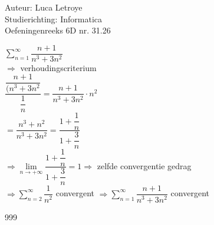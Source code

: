 \documentclass[a4paper]{article}
\begin{document}
  
\noindent \large Auteur: Luca Letroye \\
\noindent \large Studierichting: Informatica\\
\noindent \large Oefeningenreeks 6D nr. 31.26

\medskip
\normalsize

$ \displaystyle\sum_{n=1}^{\infty} \dfrac{n+1}{n^3+3n^2} $\\

$\Rightarrow $ verhoudingscriterium\\

$\dfrac{\dfrac{n+1}{(n^3+3n^2}}{\dfrac{1}{n}} = \dfrac{n+1}{n^3+3n^2}\cdot n^2$\\

$= \dfrac{n^3+n^2}{n^3+3n^2} =  \dfrac{1+\dfrac{1}{n}}{1 + \dfrac{3}{n}}$\\

$\Rightarrow \lim\limits_{n\rightarrow +\infty} \dfrac{1+\dfrac{1}{n}}{1 + \dfrac{3}{n}}  = 1 \Rightarrow $ zelfde convergentie gedrag\\

$\Rightarrow  \displaystyle\sum_{n=2}^{\infty} \dfrac{1}{n^2} $ convergent $\Rightarrow \displaystyle\sum_{n=1}^{\infty} \dfrac{n+1}{n^3+3n^2}$ convergent\\






\begin{thebibliography}{999}
\end{thebibliography}
\end{document}
